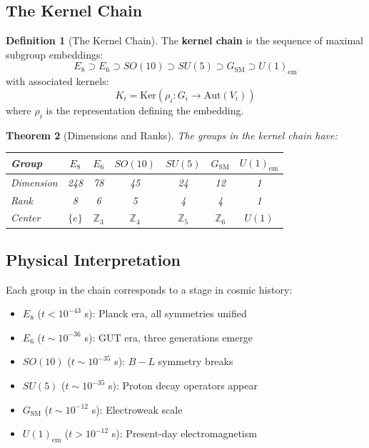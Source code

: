 \documentclass[11pt,a4paper,openright]{book}
\theoremstyle{plain}
\newtheorem{theorem}{Theorem}[chapter]
\theoremstyle{definition}
\newtheorem{definition}[theorem]{Definition}
\newcommand{\SM}{\mathrm{SM}}
\newcommand{\Ker}{\mathrm{Ker}}
\newcommand{\Aut}{\mathrm{Aut}}
\newcommand{\Z}{\mathbb{Z}}
\begin{document}
\subsection{The Kernel Chain}

\begin{definition}[The Kernel Chain]
The \textbf{kernel chain} is the sequence of maximal subgroup embeddings:
\begin{equation}
E_8 \supset E_6 \supset SO(10) \supset SU(5) \supset G_{\SM} \supset U(1)_{\mathrm{em}}
\end{equation}
with associated kernels:
\begin{equation}
K_i = \Ker(\rho_i: G_i \to \Aut(V_i))
\end{equation}
where $\rho_i$ is the representation defining the embedding.
\end{definition}

\begin{theorem}[Dimensions and Ranks]
\label{thm:chain-dimensions}
The groups in the kernel chain have:
\begin{center}
\begin{tabular}{lcccccc}
\toprule
Group & $E_8$ & $E_6$ & $SO(10)$ & $SU(5)$ & $G_{\SM}$ & $U(1)_{\mathrm{em}}$ \\
\midrule
Dimension & 248 & 78 & 45 & 24 & 12 & 1 \\
Rank & 8 & 6 & 5 & 4 & 4 & 1 \\
Center & $\{e\}$ & $\Z_3$ & $\Z_4$ & $\Z_5$ & $\Z_6$ & $U(1)$ \\
\bottomrule
\end{tabular}
\end{center}
\end{theorem}

\subsection{Physical Interpretation}

Each group in the chain corresponds to a stage in cosmic history:

\begin{itemize}
    \item $E_8$ ($t < 10^{-43}$ s): Planck era, all symmetries unified
    \item $E_6$ ($t \sim 10^{-36}$ s): GUT era, three generations emerge
    \item $SO(10)$ ($t \sim 10^{-35}$ s): $B-L$ symmetry breaks
    \item $SU(5)$ ($t \sim 10^{-35}$ s): Proton decay operators appear
    \item $G_{\SM}$ ($t \sim 10^{-12}$ s): Electroweak scale
    \item $U(1)_{\mathrm{em}}$ ($t > 10^{-12}$ s): Present-day electromagnetism
\end{itemize}
\end{document}
